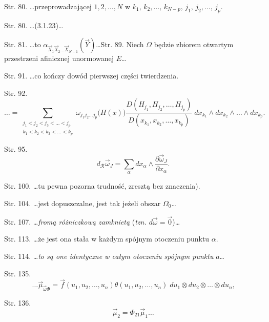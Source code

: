 \documentclass[a4paper,11pt]{article}
\begin{document}
\start Str. 80. \ldots przeprowadzającej $1, 2, \ldots, N$ w
$k_{ 1 }, \, k_{ 2 }, \ldots, \, k_{ N - p }, \, j_{ 1 }, \, j_{ 2 },
\ldots, \, j_{ p }$.

\start Str. 80. \ldots (3.1.23)\ldots

\start Str. 81. \ldots to
$\alpha_{ \vec{ X }_{ 1 } \vec{ X }_{ 2 } \ldots \vec{ X }_{ N - 1 } }
( \vec{ Y } )$\ldots \start Str. 89. Niech $\Omega$ będzie zbiorem
otwartym przestrzeni af\mbox{}inicznej unormowanej $E$\ldots

\start Str. 91. \ldots co kończy dowód pierwszej części twierdzenia.

\start Str. 92. $$\ldots = \sum_{ \substack{ j_{ 1 } < j_{ 2 } < j_{ 3 } < \ldots < j_{ p } \\
    k_{ 1 } < k_{ 2 } < k_{ 3 } < \ldots < k_{ p } } } \omega_{ j_{ 1
  } j_{ 2 } \ldots j_{ p } } \big( H( x ) \big) \frac{ D( H_{ j_{ 1 }
  }, H_{ j_{ 2 } }, \ldots, H_{ j_{ p } } ) }{ D( x_{ k_{ 1 } }, x_{
    k_{ 2 } }, \ldots, x_{ k_{ p } } ) } \; dx_{ k_{ 1 } } \wedge dx_{
  k_{ 2 } } \wedge \ldots \wedge dx_{ k_{ p } } \textrm{.}$$

\start Str. 95.
$$d_{ \mathcal{ R } } \vec{ \omega }_{ J } = \sum_{ \alpha } dx_{
  \alpha} \wedge \frac{ \partial \vec{ \omega }_{ J } }{ \partial x_{
    \alpha } } \textrm{.}$$

\start Str. 100. \ldots tu pewna pozorna trudność, zresztą bez
znaczenia).

\start Str. 104. \ldots jest dopuszczalne, jest tak jeżeli obszar
$\Omega_{ 0 }$\ldots

\start Str. 107. \ldots\emph{fromą różniczkową zamknietą} (\emph{tzn.
  $d\vec{ \omega } = \vec{ 0 }$})\ldots

\start Str. 113. \ldots że jest ona stała w każdym spójnym otoczeniu
punktu $\alpha$.

\start Str. 114. \ldots\emph{to są one identyczne w całym otoczeniu
  spójnym punktu} $a$\ldots

\start Str. 135.
$$\ldots \vec{ \mu }_{ \vec{ \omega } \Phi } = \vec{ f }( u_{ 1 },
u_{ 2 }, \ldots, u_{ n } ) \theta( u_{ 1 }, u_{ 2 }, \ldots, u_{ n } )
\; du_{ 1 } \otimes du_{ 2 } \otimes \ldots \otimes du_{ n }
\textrm{,}$$

\start Str. 136.
$$\vec{ \mu }_{ 2 } = \Phi_{ 2 1 } \vec{ \mu }_{ 1 } \ldots$$





 {}




\end{document}
